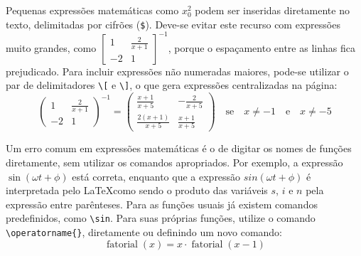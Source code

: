 Pequenas expressões matemáticas como $x_0^2$ podem ser inseridas
diretamente no texto, delimitadas por cifrões (\texttt{\$}). Deve-se
evitar este recurso com expressões muito grandes, como
$\left[\begin{array}{cc} 1 & \frac{2}{x+1} \\ -2 &
1\end{array}\right]^{-1}$, porque o espaçamento entre as linhas fica
prejudicado. Para incluir expressões não numeradas maiores, pode-se
utilizar o par de delimitadores \verb|\[| e \verb|\]|, o que gera
expressões centralizadas na página:
\[
\left(\begin{array}{cc}
1 & \frac{2}{x+1} \\ -2 & 1
\end{array}\right)^{-1} = \left(\begin{array}{cc}
\frac{x+1}{x+5} & -\frac{2}{x+5} \\ \frac{2(x+1)}{x+5} & \frac{x+1}{x+5}
\end{array}\right) \quad
\text{se} \quad x \neq -1 \quad \text{e} \quad x \neq -5
\]

Um erro comum em expressões matemáticas é o de digitar os nomes de
funções diretamente, sem utilizar os comandos apropriados. Por
exemplo, a expressão $\sin(\omega t+\phi)$ está correta, enquanto que
a expressão $sin(\omega t+\phi)$ é interpretada pelo \LaTeX como sendo
o produto das variáveis $s$, $i$ e $n$ pela expressão entre
parênteses. Para as funções usuais já existem comandos predefinidos,
como \verb|\sin|. Para suas próprias funções, utilize o comando
\verb|\operatorname{}|, diretamente ou definindo um novo comando:
\newcommand{\fat}{\operatorname{fatorial}}
\[
\fat(x) = x \cdot \fat(x-1)
\]

